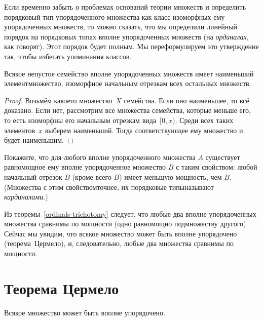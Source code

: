 Если временно забыть о проблемах оснований теории множеств и
определить порядковый тип упорядоченного множества как класс
изоморфных ему упорядоченных
множеств, то можно сказать, что мы
определили линейный порядок на порядковых типах вполне
упорядоченных множеств (на \emph{ординалах}, как говорят).
Этот порядок будет полным. Мы переформулируем это утверждение так,
чтобы избегать упоминания классов.
\begin{theorem}\label{complete-order-on-ordinals}
Всякое непустое семейство вполне упорядоченных множеств
имеет  наименьший элемент\т множество, изоморфное
начальным отрезкам всех остальных множеств.
\end{theorem}

\begin{proof}
Возьмём какое\д то множество~$X$ семейства. Если оно наименьшее, то
всё доказано. Если нет, рассмотрим все множества семейства,
которые меньше его, то есть изоморфны его начальным отрезкам
вида~$[0,x)$. Среди всех таких элементов~$x$ выберем наименьший.
Тогда соответствующее ему множество и будет наименьшим.
\end{proof}

\begin{problem}
Покажите, что для любого вполне упорядоченного множества $A$ существует равномощное ему вполне упорядоченное множество $B$ с таким свойством: любой начальный отрезок $B$ (кроме всего $B$) имеет меньшую мощность, чем $B$.  (Множества с этим свойством\т точнее, их порядковые типы\т называют \emph{кардиналами}.)
\end{problem}

Из теоремы~\ref{ordinals-trichotomy} следует, что любые два вполне
упорядоченных множества сравнимы по мощности (одно равномощно
подмножеству другого). Сейчас мы увидим, что всякое множество
может быть вполне упорядочено (теорема~Цермело), и, следовательно,
любые два множества сравнимы по мощности.

\section{Теорема Цермело}
        \label{zermelo}

\begin{theorem}[Цермело]
        \label{theorem-zermelo}
Всякое множество может быть вполне упорядочено.
\end{theorem}

